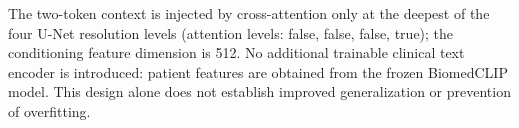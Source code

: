 The two-token context is injected by cross-attention only at the deepest of the four U-Net resolution levels (attention levels: false, false, false, true); the conditioning feature dimension is 512. No additional trainable clinical text encoder is introduced: patient features are obtained from the frozen BiomedCLIP model. This design alone does not establish improved generalization or prevention of overfitting.
